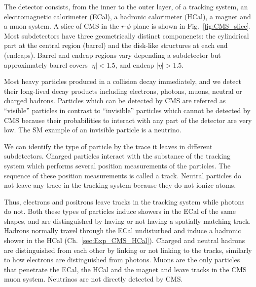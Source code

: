 The detector consists, from the inner to the outer layer,  of a tracking system, an electromagnetic calorimeter (ECal), a hadronic calorimeter (HCal), a magnet and a muon system. A slice of CMS in the $r$-$\phi$ plane is shown in Fig.~\ref{fig:CMS_slice}. Most subdetectors have three geometrically distinct componenets: the cylindrical part at the central region (barrel) and the disk-like structures at each end (endcaps). Barrel and endcap regions vary depending a subdetector but approximately barrel covers $|\eta|<$1.5, and endcap $|\eta|>$1.5.

Most heavy particles produced in a collision decay immediately, and we detect their long-lived decay products including electrons, photons, muons, neutral or charged hadrons. Particles which can be detected by CMS are referred as ``visible'' particles in contrast to ``invisible'' particles which cannot be detected by CMS because their probabilities to interact with any part of the detector are very low. The SM example of an invisible particle is a neutrino.

We can identify the type of particle by the trace it leaves in different subdetectors. Charged particles interact with the substance of the tracking system which performs several position measurements of the particles. The sequence of these position measurements is called a track. Neutral particles do not leave any trace in the tracking system because they do not ionize atoms. 

Thus, electrons and positrons leave tracks in the tracking system while photons do not. Both these types of particles induce showers in the ECal of the same shapes, and are distinguished by having or not having a spatially matching track. Hadrons normally travel through the ECal undisturbed and induce a hadronic shower in the HCal (Ch.~\ref{sec:Exp_CMS_HCal}). Charged and neutral hadrons are distinguished from each other by linking or not linking to the tracks, similarly to how electrons are distinguished from photons. Muons are the only particles that penetrate the ECal, the HCal and the magnet and leave tracks in the CMS muon system. Neutrinos are not directly detected by CMS.   

\clearpage

